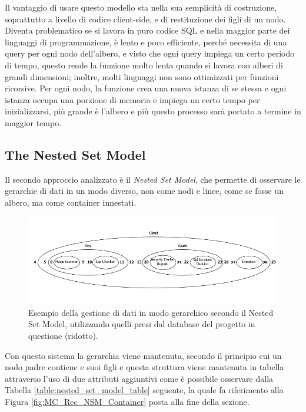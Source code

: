 \hfill\break
Il vantaggio di usare questo modello sta nella sua semplicità di costruzione, soprattutto a livello di codice client-side, 
e di restituzione dei figli di un nodo. Diventa problematico se si lavora in puro codice SQL e nella maggior parte dei linguaggi 
di programmazione, è lento e poco efficiente, perché necessita di una query per ogni nodo dell'albero, e visto che ogni query impiega 
un certo periodo di tempo, questo rende la funzione molto lenta quando si lavora con alberi di grandi dimensioni; inoltre, molti linguaggi 
non sono ottimizzati per funzioni ricorsive. Per ogni nodo, la funzione crea una nuova istanza di se stessa e ogni istanza occupa 
una porzione di memoria e impiega un certo tempo per inizializzarsi, più grande è l'albero e più questo processo sarà portato a termine 
in maggior tempo.
%
\subsection{The Nested Set Model}
Il secondo approccio analizzato è il \textit{Nested Set Model}, che permette di osservare le gerarchie di dati in un modo diverso, non 
come nodi e linee, come se fosse un albero, ma come container innestati.
%
\begin{figure}[ht!]
    \includegraphics[scale=0.66]{images/MC_Rec_NSM_Container(R).png}
    \caption{Esempio della gestione di dati in modo gerarchico secondo il Nested Set Model, utilizzando quelli presi dal database del 
    progetto in questione (ridotto).}
    \label{fig:MC_Rec_NSM_Container_R}
\end{figure}
%
Con questo sistema la gerarchia viene mantenuta, secondo il principio cui un nodo padre contiene e suoi figli e questa struttura 
viene mantenuta in tabella attraverso l'uso di due attributi aggiuntivi come è possibile osservare dalla Tabella \ref{table:nested_set_model_table} 
seguente, la quale fa riferimento alla Figura \ref{fig:MC_Rec_NSM_Container} posta alla fine della sezione.
